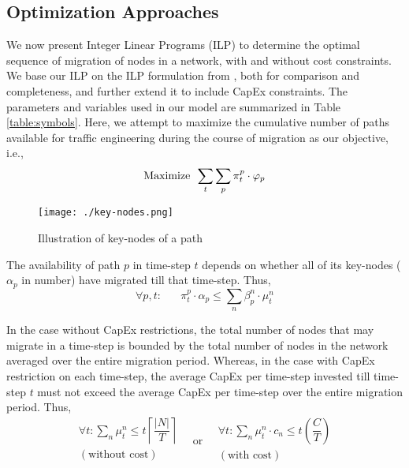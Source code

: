 \documentclass[conference]{IEEEtran}
\begin{document}
\subsection{Optimization Approaches} \label{sec:ILP}
We now present Integer Linear Programs (ILP) to determine the optimal sequence
of migration of nodes in a network, with and without cost constraints.
We base our ILP on the ILP formulation from \cite{caria-sdn-migration}, both for
comparison and completeness, and further extend it to include CapEx constraints.
The parameters and variables used in our model are summarized in Table
\ref{table:symbols}. Here, we attempt to maximize the cumulative number of paths
available for traffic engineering during the course of migration as our
objective, i.e., $$ \text{Maximize\,\,\,} \sum_t\sum_p \pi^p_t \cdot \varphi_p
$$

\begin{figure}[t]
\begin{center}
\texttt{[image: ./key-nodes.png]}
\caption{Illustration of key-nodes of a path}
\label{fig:key-nodes}
\end{center}
\vspace{-5mm}
\end{figure}

\par The availability of path $p$ in time-step $t$ depends on whether all of
its key-nodes ($\alpha_p$ in number) have migrated till that time-step. Thus,
$$
\forall p, t: \,\,\,\,\,\,\,\,\,\,
\pi^p_t \cdot \alpha_p \leq \sum_n \beta^n_p \cdot \mu^n_t
$$

\par In the case without CapEx restrictions, the total number of nodes that may
migrate in a time-step is bounded by the total number of nodes in the network
averaged over the entire migration period. Whereas, in the case with CapEx
restriction on each time-step, the average CapEx per time-step invested till
time-step $t$ must not exceed the average CapEx per time-step over the entire
migration period.
Thus, 
$$
\begin{array}{c}
\forall t: \sum_n \mu^n_t \leq t \left\lceil    \dfrac{|N|}{T}  \right\rceil\\
(\text{without cost})\\
\end{array}
\,\,\,\,\,\,\text{or}\,\,\,\,\,\,
\begin{array}{c}
\forall t:
\sum_n \mu^n_t \cdot c_n \leq t \left(   
\dfrac{C}{T} \right) \\
(\text{with cost})\\
\end{array}
$$
\end{document}
